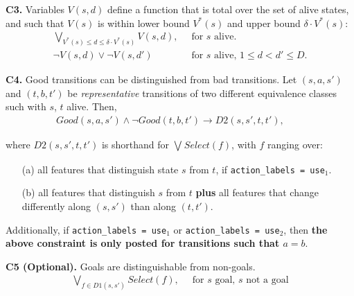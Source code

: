 \documentclass[a4paper]{article}
\newcommand{\smallpar}[1]{{\vspace{10pt}\noindent \bf #1.}}
\newcommand{\badtx}{\ensuremath{\mathrm{BAD}}}
\begin{document}
\smallpar{C3}
Variables $V(s, d)$ define a function that is total over the set of alive states,
and such that $V(s)$ is within lower bound $V^*(s)$ and upper bound $\delta \cdot V^*(s)$:
\begin{align*}
 \bigvee_{V^*(s) \leq d \leq \delta \cdot V^*(s)} V(s,d),&\;\; \text{for $s$ alive.} \\
 \neg V(s, d) \lor \neg V(s, d')&\;\; \text{for $s$ alive, $1 \leq d < d' \leq D$.}
\end{align*}


\smallpar{C4}
Good transitions can be distinguished from bad transitions.
Let $(s, a, s')$ and $(t, b, t')$ be \emph{representative} transitions
of two different equivalence classes such with $s$, $t$ alive. Then,
\begin{align*}
 Good(s, a, s') \land \neg Good(t, b, t') \rightarrow
 D2(s, s', t, t'),&\;\; \text{  }
\end{align*}


\noindent where $D2(s, s', t, t')$ is shorthand for $\bigvee_{} Select(f)$, with $f$ ranging over:
\begin{itemize}
 \item[(a)] all features that distinguish state $s$ from $t$, if \texttt{action\_labels = use$_1$}.
 \item[(b)] all features that distinguish $s$ from $t$ \textbf{plus} all features that
 change differently along $(s, s')$ than along $(t, t')$.
\end{itemize}
Additionally, if \texttt{action\_labels = use$_1$} or \texttt{action\_labels = use$_2$}, then
\textbf{the above constraint is only posted for transitions such that $a=b$}.


\smallpar{C5 (Optional)}
Goals are distinguishable from non-goals.
\begin{align*}
\bigvee_{f \in D1(s, s')} Select(f),&\;\; \text{for $s$ goal, $s$ not a goal}
\end{align*}


%
\end{document}
